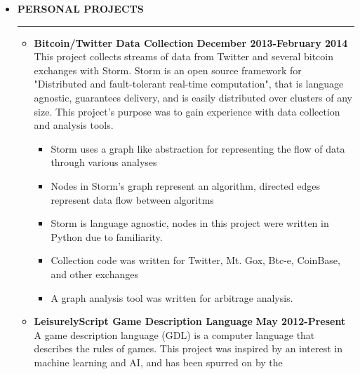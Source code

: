 \documentclass[overlapped]{res}
\begin{document}
\begin{resume}
\begin{itemize}[leftmargin=0in]
    \item[] \textbf{PERSONAL PROJECTS} \\[-0.1in] \rule{\textwidth}{0.5pt}
        \begin{itemize}[leftmargin=0in]
            \item[] 
                \begin{samepage}
                    \textbf{Bitcoin/Twitter Data Collection} \hfill \textbf{December 2013-February 2014} \\
                    This project collects streams of data from Twitter and several bitcoin exchanges with Storm. Storm is an open 
                    source framework for "Distributed and fault-tolerant real-time computation", that is language agnostic,
                    guarantees delivery, and is easily distributed over clusters of any size. This project's purpose was to gain experience
                    with data collection and analysis tools. 
                    \begin{itemize}
                        \item[\textbullet] Storm uses a graph like abstraction for representing the flow of data through various analyses
                        \item[\textbullet] Nodes in Storm's graph represent an algorithm, directed edges represent data flow between algoritms
                        \item[\textbullet] Storm is language agnostic, nodes in this project were written in Python due to familiarity.
                        \item[\textbullet] Collection code was written for Twitter, Mt. Gox, Btc-e, CoinBase, and other exchanges
                        \item[\textbullet] A graph analysis tool was written for arbitrage analysis.
                    \end{itemize}
                \end{samepage}
            \item[] 
                \begin{samepage}
                    \textbf{LeisurelyScript Game Description Language} \hfill \textbf{May 2012-Present} \\
                    A game description language (GDL) is a computer language that describes the rules of games. 
                    This project was inspired by an interest in machine learning and AI, and has been spurred on by the 

\end{samepage}
\end{itemize}
\end{itemize}
\end{resume}
\end{document}
